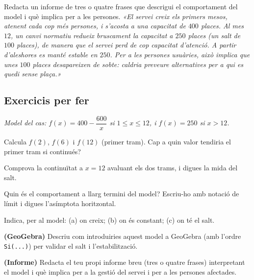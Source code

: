 \begin{exresolt}
Redacta un informe de tres o quatre frases que descrigui el comportament del model i
què implica per a les persones.
\solucio
\textit{«El servei creix els primers mesos, atenent cada cop més persones, i s'acosta
a una capacitat de $400$ places. Al mes $12$, un canvi normatiu redueix bruscament la
capacitat a $250$ places (un salt de $100$ places), de manera que el servei perd de cop
capacitat d'atenció. A partir d'aleshores es manté estable en $250$. Per a les persones
usuàries, això implica que unes $100$ places desapareixen de sobte: caldria preveure
alternatives per a qui es quedi sense plaça.»}
\end{exresolt}

\subsection{Exercicis per fer}

\noindent\textit{Model del cas: $f(x)=400-\dfrac{600}{x}$ si $1\le x\le 12$, i
$f(x)=250$ si $x>12$.}

\begin{exercicis}
\begin{exlist}
  \item Calcula $f(2)$, $f(6)$ i $f(12)$ (primer tram). Cap a quin valor tendiria el
        primer tram si continués?
  \item Comprova la continuïtat a $x=12$ avaluant els dos trams, i digues la mida del
        salt.
  \item Quin és el comportament a llarg termini del model? Escriu-ho amb notació de
        límit i digues l'asímptota horitzontal.
  \item Indica, per al model: (a) on creix; (b) on és constant; (c) on té el salt.
  \item \textbf{(GeoGebra)} Descriu com introduiries aquest model a GeoGebra (amb
        l'ordre \texttt{Si(...)}) per validar el salt i l'estabilització.
  \item \textbf{(Informe)} Redacta el teu propi informe breu (tres o quatre frases)
        interpretant el model i què implica per a la gestió del servei i per a les
        persones afectades.
\end{exlist}
\end{exercicis}

